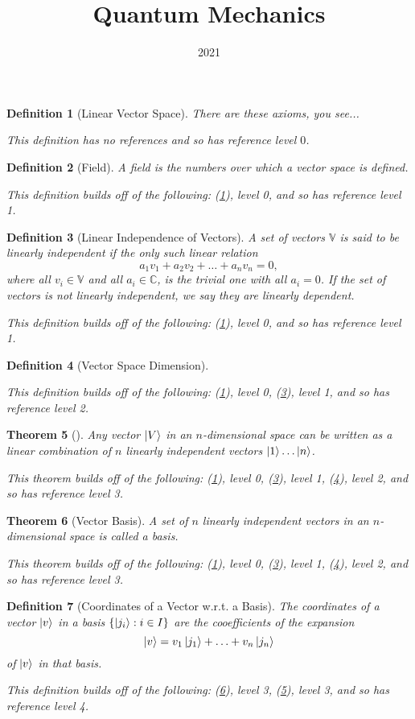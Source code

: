 \documentclass{article}
\title{Quantum Mechanics}
\author{}
\date{2021}
\newtheorem{definition}{Definition}
\newtheorem{theorem}[definition]{Theorem}
\begin{document}
\maketitle

\begin{definition}[Linear Vector Space]\label{0}There are these axioms, you see...
 
 This definition has no references and so has reference level $0$.\end{definition}
\begin{definition}[Field]\label{1}A field is the numbers over which a vector space is defined.
 
 This definition builds off of the following: (\ref{0}), level 0, and so has reference level 1.\end{definition}
\begin{definition}[Linear Independence of Vectors]\label{2}A set of vectors $\mathbb{V}$ is said to be linearly independent if the only such
linear relation $$a_1v_1+a_2v_2+\ldots+a_nv_n=0,$$ where all $v_i\in\mathbb{V}$ and all
$a_i\in\mathbb{C}$, is the trivial one with all $a_i = 0$. If the set of vectors
is not linearly independent, we say they are linearly dependent. 
 
 This definition builds off of the following: (\ref{0}), level 0, and so has reference level 1.\end{definition}
\begin{definition}[Vector Space Dimension]\label{3}
 
 This definition builds off of the following: (\ref{0}), level 0, (\ref{2}), level 1, and so has reference level 2.\end{definition}
\begin{theorem}[]\label{4}Any vector $\ket{V}$ in an $n$-dimensional space can be written as a
linear combination of $n$ linearly independent vectors $\ket{1}\ldots\ket{n}$.
 
 This theorem builds off of the following: (\ref{0}), level 0, (\ref{2}), level 1, (\ref{3}), level 2, and so has reference level 3.\end{theorem}
\begin{theorem}[Vector Basis]\label{5}A set of $n$ linearly independent vectors in an $n$-dimensional space
 is called a basis.
 
 This theorem builds off of the following: (\ref{0}), level 0, (\ref{2}), level 1, (\ref{3}), level 2, and so has reference level 3.\end{theorem}
\begin{definition}[Coordinates of a Vector w.r.t. a Basis]\label{6}The coordinates of a vector $\ket{v}$ in a basis $\{\ket{j_i}:i\in I\}$
 are the cooefficients of the expansion $$\ket{v}=v_1\ket{j_1}+\ldots+v_n\ket{j_n}$$ 
 of $\ket{v}$ in that basis.
 
 This definition builds off of the following: (\ref{5}), level 3, (\ref{4}), level 3, and so has reference level 4.\end{definition}
\end{document}
